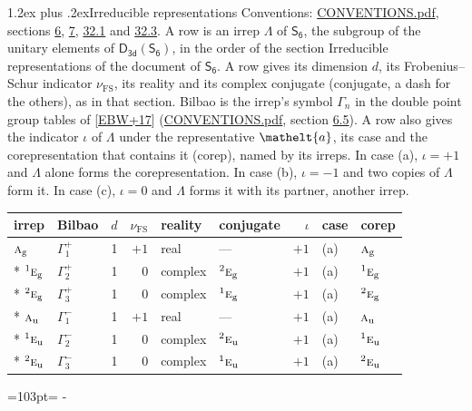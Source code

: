 \documentclass[10pt,a4paper]{article}
\makeatletter
\renewcommand\section{\@startsection{section}{1}{\z@}{-3ex plus -1ex minus -.2ex}%
  {1.2ex plus .2ex}{\normalfont\large\sffamily\bfseries\color{parttitle}}}
\newcommand{\needspace}[1]{\par\penalty-100\begingroup\dimen0=#1\relax\dimen2=\pagegoal
  \advance\dimen2-\pagetotal\ifdim\dimen0>\dimen2\relax\ifdim\dimen2>0pt\vfil\break\fi\fi
  \endgroup}
\numberwithin{equation}{section}
\newcommand{\eltfont}[1]{{\let\sigma\eltsigma\mathelt{#1}}}
\newcommand{\grp}[1]{\mathsf{#1}}
\newcommand{\irr}[1]{\text{\normalfont\scshape #1}}
\newcommand{\conjpair}[1]{{}^{#1}}
\newcommand{\elt}[1]{\eltfont{#1}}
\newcommand{\ptag}[1]{\mathrm{#1}}
\newcommand{\fsind}{\nu_{\mathrm{FS}}}
\makeatother
\begin{document}
\section{Irreducible representations}\label{s:irreps}
Conventions: \href{../../CONVENTIONS.pdf}{CONVENTIONS.pdf}, sections \href{../../../rotation/CONVENTIONS.pdf\#conv.6}{6}, \href{../../../rotation/CONVENTIONS.pdf\#conv.7}{7}, \href{../../CONVENTIONS.pdf\#conv.32.1}{32.1} and \href{../../CONVENTIONS.pdf\#conv.32.3}{32.3}.
\leavevmode\label{n:irrep.Delta}A row is an irrep $\Lambda$ of $\grp{S_{6}}$, the subgroup of the unitary elements of $\grp{D_{3d}}(\grp{S_{6}})$, in the order of the section Irreducible representations of the document of \href{../../../rotation/data/pdf/S6.pdf}{$\grp{S_{6}}$}. \label{n:index.dimension}\label{n:index.frobenius}\label{n:head.irrep}\label{n:head.reality}\label{n:head.conjugate}A row gives its dimension $d$, its Frobenius--Schur indicator $\fsind$, its reality and its complex conjugate (conjugate, a dash for the others), as in that section. \label{n:head.bilbao}\label{n:irrep.alias.gamma}Bilbao is the irrep's symbol $\Gamma_n$ in the double point group tables of [\href{../../../REFERENCES.pdf\#ref.EBW+17}{EBW+17}] (\href{../../CONVENTIONS.pdf}{CONVENTIONS.pdf}, section \href{../../../rotation/CONVENTIONS.pdf\#conv.6.5}{6.5}). \label{n:head.case.corep}\label{n:head.corep}A row also gives the indicator $\iota$ of $\Lambda$ under the representative $\elt{a}$, its case and the corepresentation that contains it (corep), named by its irreps. In case (a), $\iota = +1$ and $\Lambda$ alone forms the corepresentation. In case (b), $\iota = -1$ and two copies of $\Lambda$ form it. In case (c), $\iota = 0$ and $\Lambda$ forms it with its partner, another irrep.
\setlength{\emergencystretch}{2em}\par\setlength{\emergencystretch}{0pt}
{\small\renewcommand{\arraystretch}{1.25}\setlength{\tabcolsep}{4pt}\begin{longtable}{@{}llrrllrll@{}}\toprule
irrep & Bilbao & $d$ & $\fsind$ & reality & conjugate & $\iota$ & case & corep\\\midrule\endhead
\bottomrule\endfoot\endlastfoot
$\irr{a}_{\ptag{g}}$ & $\Gamma_{1}^{+}$ & 1 & $+1$ & real & --- & $+1$ & (a) & $\irr{a}_{\ptag{g}}$\\*
$\conjpair{1}\irr{e}_{\ptag{g}}$ & $\Gamma_{2}^{+}$ & 1 & $0$ & complex & $\conjpair{2}\irr{e}_{\ptag{g}}$ & $+1$ & (a) & $\conjpair{1}\irr{e}_{\ptag{g}}$\\*
$\conjpair{2}\irr{e}_{\ptag{g}}$ & $\Gamma_{3}^{+}$ & 1 & $0$ & complex & $\conjpair{1}\irr{e}_{\ptag{g}}$ & $+1$ & (a) & $\conjpair{2}\irr{e}_{\ptag{g}}$\\*
$\irr{a}_{\ptag{u}}$ & $\Gamma_{1}^{-}$ & 1 & $+1$ & real & --- & $+1$ & (a) & $\irr{a}_{\ptag{u}}$\\*
$\conjpair{1}\irr{e}_{\ptag{u}}$ & $\Gamma_{2}^{-}$ & 1 & $0$ & complex & $\conjpair{2}\irr{e}_{\ptag{u}}$ & $+1$ & (a) & $\conjpair{1}\irr{e}_{\ptag{u}}$\\*
$\conjpair{2}\irr{e}_{\ptag{u}}$ & $\Gamma_{3}^{-}$ & 1 & $0$ & complex & $\conjpair{1}\irr{e}_{\ptag{u}}$ & $+1$ & (a) & $\conjpair{2}\irr{e}_{\ptag{u}}$\\
\bottomrule\end{longtable}}
\needspace{103pt}
\end{document}
